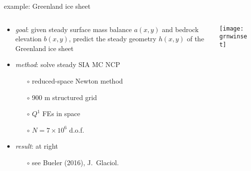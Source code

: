 \documentclass[xcolor={dvipsnames}]{beamer}
\begin{document}
\begin{frame}{example: Greenland ice sheet}

\begin{columns}
\begin{column}{0.6\textwidth}
\begin{itemize}
\item \emph{goal}: given steady surface mass balance $a(x,y)$ and bedrock elevation $b(x,y)$, predict the steady geometry $h(x,y)$ of the Greenland ice sheet

\bigskip
\item \emph{method}: solve steady SIA MC NCP
  \begin{itemize}
  \item[$\circ$] reduced-space Newton method
  \item[$\circ$] 900 m structured grid
  \item[$\circ$] $Q^1$ FEs in space
  \item[$\circ$] $N=7\times 10^6$ d.o.f.
  \end{itemize}
\item \emph{result}: at right
  \begin{itemize}
  \item[$\circ$] see Bueler (2016), J.~Glaciol.
  \end{itemize}
\end{itemize}
\end{column}
\begin{column}{0.4\textwidth}
\vspace{-5mm}

\begin{center}
\texttt{[image: grnwinset]}
\end{center}
\end{column}
\end{columns}
\end{frame}
\end{document}
